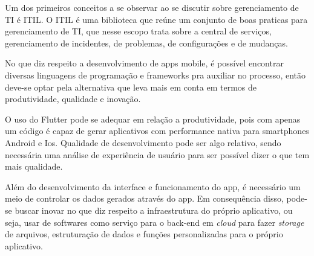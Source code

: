 Um dos primeiros conceitos a se observar ao se discutir sobre gerenciamento de TI é ITIL. O ITIL é uma biblioteca que reúne um conjunto de boas praticas para gerenciamento de TI, que nesse escopo trata sobre a central de serviços, gerenciamento de incidentes, de problemas, de configurações e de mudanças.

No que diz respeito a desenvolvimento de apps mobile, é possível encontrar diversas linguagens de programação e frameworks pra auxiliar no processo, então deve-se optar pela alternativa que leva mais em conta em termos de produtividade, qualidade e inovação. 

O uso do Flutter pode se adequar em relação a produtividade, pois com apenas um código é capaz de gerar aplicativos com performance nativa para smartphones Android e Ios. Qualidade de desenvolvimento pode ser algo relativo, sendo necessária uma análise de experiência de usuário para ser possível dizer o que tem mais qualidade.

Além do desenvolvimento da interface e funcionamento do app, é necessário um meio de controlar os dados gerados através do app. Em consequência disso, pode-se buscar inovar no que diz respeito a infraestrutura do próprio aplicativo, ou seja, usar de softwares como serviço para o back-end em \textit{cloud} para fazer \textit{storage} de arquivos, estruturação de dados e funções personalizadas para o próprio aplicativo.